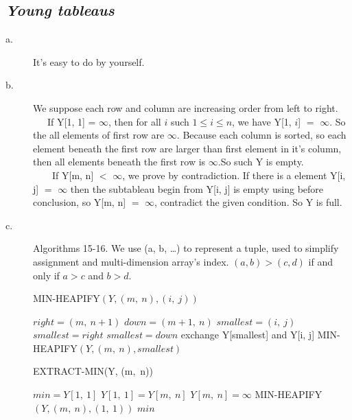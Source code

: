 \documentclass[10pt]{article}
\begin{document}
\subsection*{\textit{\textbf{Young tableaus}}}
\begin{description}
\item[a. ] It's easy to do by yourself.
\item[b. ] We suppose each row and column are increasing order from left to right.\\
\indent~~~If Y[1, 1] = $\infty$, then for all $i$ such $1 \le i \le n$, we have Y[1, $i$] $=$ $\infty$. So the all elements of first row are $\infty$. Because each column is sorted, so each element beneath the first row are larger than first element in it's column, then all elements beneath the first row is $\infty$.So such Y is empty.\\
\indent~~~~If Y[m, n] $<$ $\infty$, we prove by contradiction. If there is a element Y[i, j] $=$ $\infty$ then the subtableau begin from Y[i, j] is empty using before conclusion, so Y[m, n] $=$ $\infty$, contradict the given condition. So Y is full.
\item[c. ] Algorithms 15-16. We use (a, b, \ldots) to represent a tuple, used to simplify assignment and multi-dimension array's index. $(a, b) > (c, d)$ if and only if $a > c$ and $b > d$.
  \begin{algorithm}
    \caption{MIN-HEAPIFY$(Y, (m,\ n), (i,\ j))$}
    \begin{algorithmic}[1]
      \STATE $right = (m,\ n+1)$
      \STATE $down = (m+1,\ n)$
      \STATE $smallest = (i,\ j)$
      \STATE $smallest = right$
      \ENDIF
      \STATE $smallest = down$
      \ENDIF
      \STATE exchange Y[smallest] and Y[i, j]
      \STATE MIN-HEAPIFY$(Y, (m,\ n), smallest)$
      \ENDIF
    \end{algorithmic}
  \end{algorithm}

  \begin{algorithm}
    \caption{EXTRACT-MIN(Y, (m,\ n))}
    \begin{algorithmic}[1]
      \STATE $min = Y[1,\ 1]$
      \STATE $Y[1,\ 1] = Y[m,\ n]$
      \STATE $Y[m,\ n] = \infty$
      \STATE MIN-HEAPIFY$(Y, (m,\ n), (1,\ 1))$
      \RETURN $min$
    \end{algorithmic}
  \end{algorithm}


\end{description}
\end{document}
